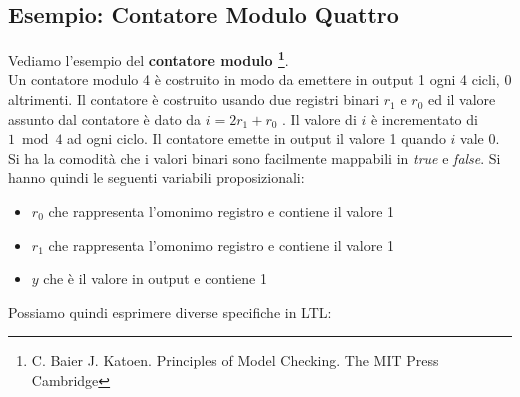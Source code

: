 \documentclass[a4paper,12pt, oneside]{book}
\begin{document}
\subsection{Esempio: Contatore Modulo Quattro}
Vediamo l'esempio del \textbf{contatore modulo \footnote[quattro]{C. Baier
    J. Katoen. Principles of Model Checking. The MIT Press Cambridge}}.\\

Un contatore modulo 4 è costruito in modo da emettere in output 1 ogni 4 cicli,
0 altrimenti. Il contatore è 
costruito usando due registri binari $r_1$ e $r_0$ ed il valore assunto dal
contatore è dato da $i = 2r_1 + r_0$ . Il valore di $i$ è incrementato di $1
\bmod 4$ ad ogni ciclo. Il contatore emette in output il valore 1 quando $i$
vale 0. Si ha la comodità che i valori binari sono facilmente mappabili in
\textit{true} e \textit{false}. Si hanno quindi le seguenti variabili
proposizionali:
\begin{itemize}
  \item $r_0$ che rappresenta l'omonimo registro e contiene il valore 1
  \item $r_1$ che rappresenta l'omonimo registro e contiene il valore 1 
  \item $y$ che è il valore in output e contiene 1
\end{itemize}
Possiamo quindi esprimere diverse specifiche in LTL:
\end{document}
